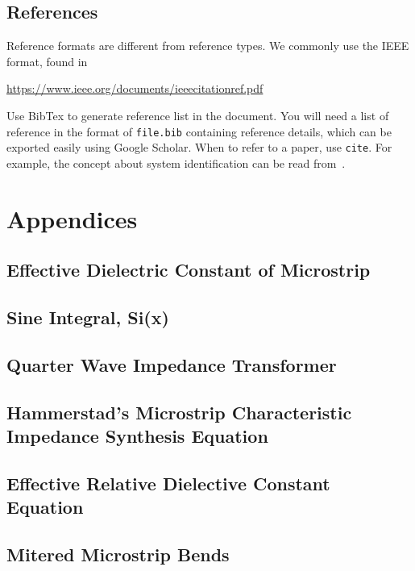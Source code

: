 \documentclass[11pt,a4paper]{article}
\begin{document}
\subsection{References}
Reference formats are different from reference types. We commonly use the IEEE format, found in 

\url{https://www.ieee.org/documents/ieeecitationref.pdf}

Use BibTex to generate reference list in the document. You will need a list of reference in the format of \texttt{file.bib} containing reference details, which can be exported easily using Google Scholar. When to refer to a paper, use \texttt{cite}. For example, the concept about system identification can be read from~\cite{SoS:89}.




\section{Appendices}
\subsection{Effective Dielectric Constant of Microstrip}

\subsection{Sine Integral, Si(x)}

\subsection{Quarter Wave Impedance Transformer}

\subsection{Hammerstad's Microstrip Characteristic Impedance Synthesis Equation}

\subsection{Effective Relative Dielective Constant Equation}

\subsection{Mitered Microstrip Bends}
\end{document}

